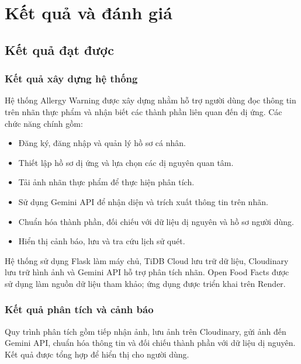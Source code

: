 
\chapter{Kết quả và đánh giá}
\label{ch:ketqua}

\section{Kết quả đạt được}

\subsection{Kết quả xây dựng hệ thống}

Hệ thống Allergy Warning được xây dựng nhằm hỗ trợ người dùng đọc
thông tin trên nhãn thực phẩm và nhận biết các thành phần liên quan
đến dị ứng. Các chức năng chính gồm:

\begin{itemize}
	\item Đăng ký, đăng nhập và quản lý hồ sơ cá nhân.
	\item Thiết lập hồ sơ dị ứng và lựa chọn các dị nguyên quan tâm.
	\item Tải ảnh nhãn thực phẩm để thực hiện phân tích.
	\item Sử dụng Gemini API để nhận diện và trích xuất thông tin trên nhãn.
	\item Chuẩn hóa thành phần, đối chiếu với dữ liệu dị nguyên và hồ sơ người dùng.
	\item Hiển thị cảnh báo, lưu và tra cứu lịch sử quét.
\end{itemize}

Hệ thống sử dụng Flask làm máy chủ, TiDB Cloud lưu trữ dữ liệu,
Cloudinary lưu trữ hình ảnh và Gemini API hỗ trợ phân tích nhãn.
Open Food Facts được sử dụng làm nguồn dữ liệu tham khảo; ứng dụng
được triển khai trên Render.

\subsection{Kết quả phân tích và cảnh báo}

Quy trình phân tích gồm tiếp nhận ảnh, lưu ảnh trên Cloudinary,
gửi ảnh đến Gemini API, chuẩn hóa thông tin và đối chiếu thành phần
với dữ liệu dị nguyên. Kết quả được tổng hợp để hiển thị cho người dùng.

